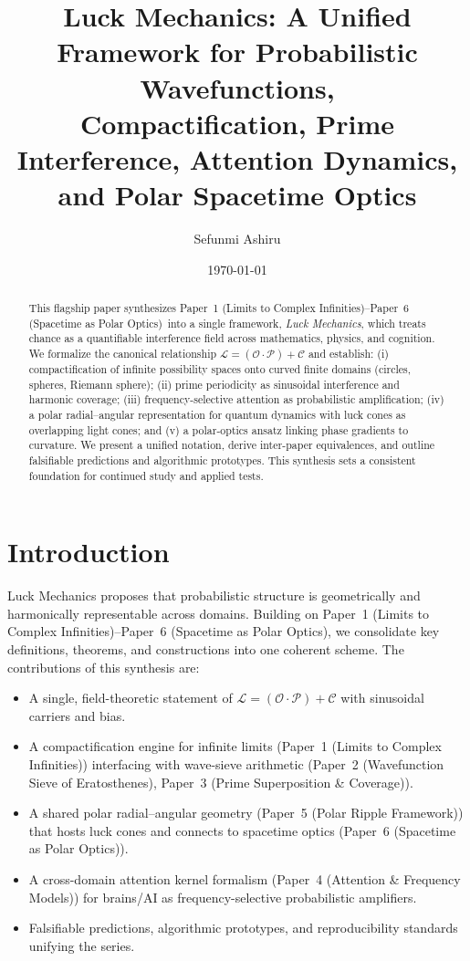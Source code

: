\documentclass[12pt]{article}
\title{Luck Mechanics: A Unified Framework for Probabilistic Wavefunctions,\\
Compactification, Prime Interference, Attention Dynamics, and Polar Spacetime Optics}
\author{Sefunmi Ashiru}
\date{\today}
\newcommand{\Luck}{\mathcal{L}}      %
\newcommand{\Opp}{\mathcal{O}}       %
\newcommand{\Prep}{\mathcal{P}}      %
\newcommand{\Circ}{\mathcal{C}}      %
\newcommand{\PaperI}{Paper~1 (Limits to Complex Infinities)}
\newcommand{\PaperII}{Paper~2 (Wavefunction Sieve of Eratosthenes)}
\newcommand{\PaperIII}{Paper~3 (Prime Superposition \& Coverage)}
\newcommand{\PaperIV}{Paper~4 (Attention \& Frequency Models)}
\newcommand{\PaperV}{Paper~5 (Polar Ripple Framework)}
\newcommand{\PaperVI}{Paper~6 (Spacetime as Polar Optics)}
\newcommand{\LuckFormula}{\Luck = (\Opp \cdot \Prep) + \Circ}
\theoremstyle{plain}
\theoremstyle{definition}
\theoremstyle{remark}
\begin{document}
\maketitle

\begin{abstract}
This flagship paper synthesizes \PaperI–\PaperVI\ into a single framework, \emph{Luck Mechanics}, which treats chance as a quantifiable interference field across mathematics, physics, and cognition. We formalize the canonical relationship \(\LuckFormula\) and establish: (i) compactification of infinite possibility spaces onto curved finite domains (circles, spheres, Riemann sphere); (ii) prime periodicity as sinusoidal interference and harmonic coverage; (iii) frequency-selective attention as probabilistic amplification; (iv) a polar radial–angular representation for quantum dynamics with luck cones as overlapping light cones; and (v) a polar-optics ansatz linking phase gradients to curvature. We present a unified notation, derive inter-paper equivalences, and outline falsifiable predictions and algorithmic prototypes. This synthesis sets a consistent foundation for continued study and applied tests.
\end{abstract}

\tableofcontents
\newpage

\section{Introduction}
Luck Mechanics proposes that probabilistic structure is geometrically and harmonically representable across domains. Building on \PaperI–\PaperVI, we consolidate key definitions, theorems, and constructions into one coherent scheme. The contributions of this synthesis are:
\begin{itemize}[leftmargin=1.1em]
  \item A single, field-theoretic statement of \(\LuckFormula\) with sinusoidal carriers and bias.
  \item A compactification engine for infinite limits (\PaperI) interfacing with wave-sieve arithmetic (\PaperII, \PaperIII).
  \item A shared polar radial–angular geometry (\PaperV) that hosts luck cones and connects to spacetime optics (\PaperVI).
  \item A cross-domain attention kernel formalism (\PaperIV) for brains/AI as frequency-selective probabilistic amplifiers.
  \item Falsifiable predictions, algorithmic prototypes, and reproducibility standards unifying the series.
\end{itemize}
\end{document}
